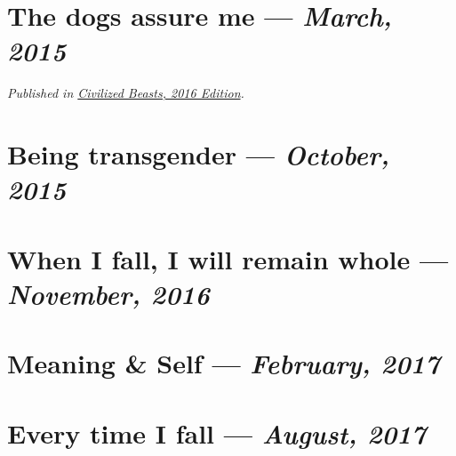 \documentclass[10pt]{memoir}
\begin{document}

  \section{The dogs assure me --- \textit{March, 2015}}

  

  \textit{Published in \underline{Civilized Beasts, 2016 Edition}.}
  \cleartoverso


  \section{Being transgender --- \textit{October, 2015}}

  
  \newpage


  \section{When I fall, I will remain whole --- \textit{November, 2016}}

  
  \cleartoverso


  \section{Meaning \& Self --- \textit{February, 2017}}

  
  \newpage

  \section{Every time I fall --- \textit{August, 2017}}

  
\end{document}

